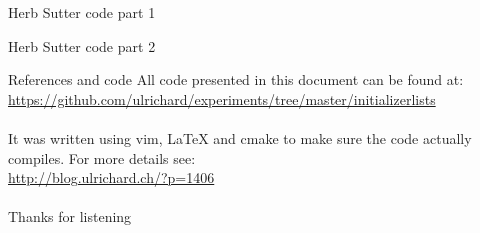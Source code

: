 \documentclass[11pt]{beamer}
\begin{document}
\begin{frame}{Herb Sutter code part 1}

\end{frame}

\begin{frame}{Herb Sutter code part 2}

\end{frame}

\begin{frame}{References and code}
All code presented in this document can be found at:\\
\href{https://github.com/ulrichard/experiments/tree/master/initializerlists}{https://github.com/ulrichard/experiments/tree/master/initializerlists}\\
\\[0.5cm]
It was written using vim, LaTeX and cmake to make sure the code actually compiles. For more details see:\\
\href{http://blog.ulrichard.ch/?p=1406}{http://blog.ulrichard.ch/?p=1406}\\
\\[0.5cm]
Thanks for listening
\end{frame}
\end{document}
